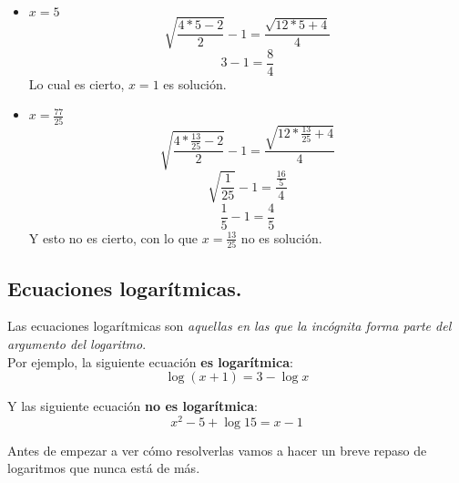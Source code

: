 \documentclass[a4paper,11pt,answers]{exam}
\newcommand\ddfrac[2]{\frac{\displaystyle #1}{\displaystyle #2}}
\begin{document}
\begin{questions}
\begin{solution}
    \begin{itemize}
    \item $x = 5$
      \[\sqrt{\frac{4*5 - 2}{2}} -1 = \frac{\sqrt{12*5 + 4}}{4}\]
      \[3 - 1 = \frac{8}{4}\]
      Lo cual es cierto, $x = 1$ es solución.
    \item $x = \frac{77}{25}$
      \[\sqrt{\dfrac{4*\frac{13}{25} - 2}{2}} - 1 =\dfrac{\sqrt{12*\frac{13}{25} + 4}}{4}\]
      \[\sqrt{\frac{1}{25}} - 1 = \ddfrac{\frac{16}{5}}{4}\]
      \[\frac{1}{5} - 1 = \frac{4}{5}\]
      Y esto no es cierto, con lo que $x = \frac{13}{25}$ no es solución.
    \end{itemize}
  \end{solution}
\end{questions}

\subsection{Ecuaciones logarítmicas.}
Las ecuaciones logarítmicas son \emph{aquellas en las que la incógnita forma parte del argumento del logaritmo}.\\

Por ejemplo, la siguiente ecuación \textbf{es logarítmica}:
\[\log (x+1) = 3-\log x\]

Y las siguiente ecuación \textbf{no es logarítmica}:
\[x^2- 5 + \log 15 = x -1\]

Antes de empezar a ver cómo resolverlas vamos a hacer un breve repaso de logaritmos que nunca
está de más.
\end{document}
